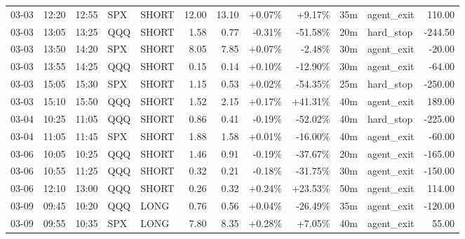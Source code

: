 \documentclass[11pt,a4paper,twoside]{article}
\begin{document}
\begin{center}
\begin{longtable}{>{\color{txtmain}}l l l l l r r r r r >{\color{txtmain}}l r}
03-03 & 12:20 & 12:55 & SPX & SHORT & 12.00 & 13.10 & \textcolor{wingreen}{+0.07\%} & \textcolor{wingreen}{+9.17\%} & 35m & agent\_exit & \textcolor{wingreen}{110.00} \\
03-03 & 13:05 & 13:25 & QQQ & SHORT & 1.58 & 0.77 & \textcolor{lossred}{-0.31\%} & \textcolor{lossred}{-51.58\%} & 20m & hard\_stop & \textcolor{lossred}{-244.50} \\
03-03 & 13:50 & 14:20 & SPX & SHORT & 8.05 & 7.85 & \textcolor{wingreen}{+0.07\%} & \textcolor{lossred}{-2.48\%} & 30m & agent\_exit & \textcolor{lossred}{-20.00} \\
03-03 & 13:55 & 14:25 & QQQ & SHORT & 0.15 & 0.14 & \textcolor{wingreen}{+0.10\%} & \textcolor{lossred}{-12.90\%} & 30m & agent\_exit & \textcolor{lossred}{-64.00} \\
03-03 & 15:05 & 15:30 & SPX & SHORT & 1.15 & 0.53 & \textcolor{wingreen}{+0.02\%} & \textcolor{lossred}{-54.35\%} & 25m & hard\_stop & \textcolor{lossred}{-250.00} \\
03-03 & 15:10 & 15:50 & QQQ & SHORT & 1.52 & 2.15 & \textcolor{wingreen}{+0.17\%} & \textcolor{wingreen}{+41.31\%} & 40m & agent\_exit & \textcolor{wingreen}{189.00} \\
03-04 & 10:25 & 11:05 & QQQ & SHORT & 0.86 & 0.41 & \textcolor{lossred}{-0.19\%} & \textcolor{lossred}{-52.02\%} & 40m & hard\_stop & \textcolor{lossred}{-225.00} \\
03-04 & 11:05 & 11:45 & SPX & SHORT & 1.88 & 1.58 & \textcolor{wingreen}{+0.01\%} & \textcolor{lossred}{-16.00\%} & 40m & agent\_exit & \textcolor{lossred}{-60.00} \\
03-06 & 10:05 & 10:25 & QQQ & SHORT & 1.46 & 0.91 & \textcolor{lossred}{-0.19\%} & \textcolor{lossred}{-37.67\%} & 20m & agent\_exit & \textcolor{lossred}{-165.00} \\
03-06 & 10:55 & 11:25 & QQQ & SHORT & 0.32 & 0.21 & \textcolor{lossred}{-0.18\%} & \textcolor{lossred}{-31.75\%} & 30m & agent\_exit & \textcolor{lossred}{-150.00} \\
03-06 & 12:10 & 13:00 & QQQ & SHORT & 0.26 & 0.32 & \textcolor{wingreen}{+0.24\%} & \textcolor{wingreen}{+23.53\%} & 50m & agent\_exit & \textcolor{wingreen}{114.00} \\
03-09 & 09:45 & 10:20 & QQQ & LONG & 0.76 & 0.56 & \textcolor{wingreen}{+0.04\%} & \textcolor{lossred}{-26.49\%} & 35m & agent\_exit & \textcolor{lossred}{-120.00} \\
03-09 & 09:55 & 10:35 & SPX & LONG & 7.80 & 8.35 & \textcolor{wingreen}{+0.28\%} & \textcolor{wingreen}{+7.05\%} & 40m & agent\_exit & \textcolor{wingreen}{55.00} \\

\end{longtable}
\end{center}
\end{document}
